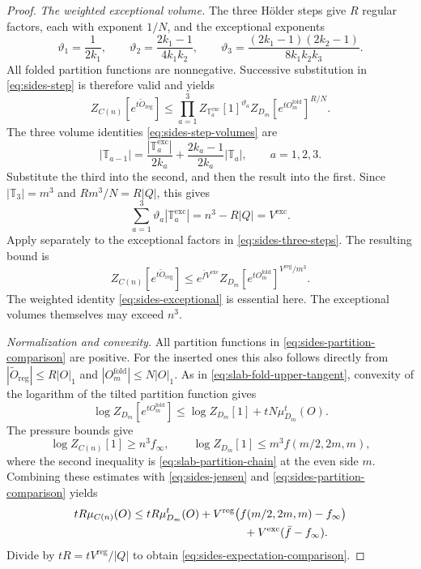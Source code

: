 \documentclass[11pt,letterpaper,reqno]{amsart}
\begin{document}
\begin{proof}
\emph{The weighted exceptional volume.}
The three H\"older steps give $R$ regular factors, each with exponent
$1/N$, and the exceptional exponents
\[
 \vartheta_1=\frac1{2k_1},\qquad
 \vartheta_2=\frac{2k_1-1}{4k_1k_2},\qquad
 \vartheta_3=\frac{(2k_1-1)(2k_2-1)}{8k_1k_2k_3}.
\]
All folded partition functions are nonnegative. Successive
substitution in \eqref{eq:sides-step} is therefore valid and yields
\begin{equation}\label{eq:sides-three-steps}
 Z_{C(n)}[e^{t\widetilde O_{\mathrm{reg}}}]
 \le\prod_{a=1}^3 Z_{\mathbb T_a^{\mathrm{exc}}}[1]^{\vartheta_a}
       Z_{D_m}[e^{tO_m^{\mathrm{fold}}}]^{R/N}.
\end{equation}
The three volume identities \eqref{eq:sides-step-volumes} are
\[
 |\mathbb T_{a-1}|=
       \frac{|\mathbb T_a^{\mathrm{exc}}|}{2k_a}
        +\frac{2k_a-1}{2k_a}|\mathbb T_a|,
        \qquad a=1,2,3.
\]
Substitute the third into the second, and then the result into the
first. Since $|\mathbb T_3|=m^3$ and $Rm^3/N=R|Q|$, this gives
\begin{equation}\label{eq:sides-exceptional}
 \sum_{a=1}^3\vartheta_a|\mathbb T_a^{\mathrm{exc}}|
       =n^3-R|Q|=V^{\mathrm{exc}}.
\end{equation}
Apply  separately to the exceptional
factors in \eqref{eq:sides-three-steps}. The resulting bound is
\begin{equation}\label{eq:sides-partition-comparison}
 Z_{C(n)}[e^{t\widetilde O_{\mathrm{reg}}}]
 \le e^{\bar f V^{\mathrm{exc}}}
       Z_{D_m}[e^{tO_m^{\mathrm{fold}}}]^{V^{\mathrm{reg}}/m^3}.
\end{equation}
The weighted identity \eqref{eq:sides-exceptional} is essential here.
The exceptional volumes themselves may exceed $n^3$.

\emph{Normalization and convexity.}
All partition functions in \eqref{eq:sides-partition-comparison}
are positive. For the inserted ones this also follows directly
from $|\widetilde O_{\mathrm{reg}}|\le R|O|_1$ and
$|O_m^{\mathrm{fold}}|\le N|O|_1$.
As in \eqref{eq:slab-fold-upper-tangent}, convexity of the logarithm
of the tilted partition function gives
\[
 \log Z_{D_m}[e^{tO_m^{\mathrm{fold}}}]
      \le\log Z_{D_m}[1]+tN\mu_{D_m}^t(O).
\]
The pressure bounds give
\[
 \log Z_{C(n)}[1]\ge n^3f_\infty,\qquad
 \log Z_{D_m}[1]\le m^3f(m/2,2m,m),
\]
where the second inequality is \eqref{eq:slab-partition-chain}
at the even side $m$. Combining these estimates with
\eqref{eq:sides-jensen} and
\eqref{eq:sides-partition-comparison} yields
\begin{align*}
 tR\mu_{C(n)}(O)
 &\le tR\mu_{D_m}^t(O)
       +V^{\mathrm{reg}}\bigl(f(m/2,2m,m)-f_\infty\bigr)\\
 &\hspace{35mm}+V^{\mathrm{exc}}(\bar f-f_\infty).
\end{align*}
Divide by $tR=tV^{\mathrm{reg}}/|Q|$ to obtain
\eqref{eq:sides-expectation-comparison}.
\end{proof}
\end{document}
